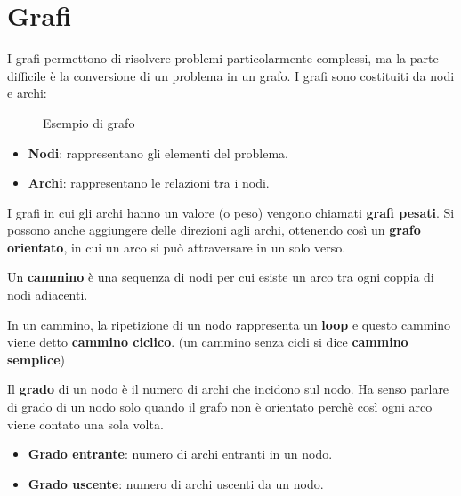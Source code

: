 \documentclass[a4paper]{article}
\begin{document}


\tableofcontents
\pagebreak

\section{Grafi}
I grafi permettono di risolvere problemi particolarmente complessi, ma la parte difficile
è la conversione di un problema in un grafo. I grafi sono costituiti da nodi e archi:
\begin{figure}[H]
  \centering
  \caption{Esempio di grafo}
  \label{fig:grafo1}
\end{figure}
\begin{itemize}
  \item \textbf{Nodi}: rappresentano gli elementi del problema.
  \item \textbf{Archi}: rappresentano le relazioni tra i nodi.
\end{itemize}
I grafi in cui gli archi hanno un valore (o peso) vengono chiamati \textbf{grafi pesati}.
Si possono anche aggiungere delle direzioni agli archi, ottenendo così un 
\textbf{grafo orientato}, in cui un arco si può attraversare in un solo verso.
\begin{definition}[Cammino]
  Un \textbf{cammino} è una sequenza di nodi per cui esiste un arco tra ogni coppia di nodi adiacenti.
\end{definition}
In un cammino, la ripetizione di un nodo rappresenta un \textbf{loop} e questo cammino
viene detto \textbf{cammino ciclico}. (un cammino senza cicli si dice \textbf{cammino
semplice})

Il \textbf{grado} di un nodo è il numero di archi che incidono sul nodo. Ha senso parlare
di grado di un nodo solo quando il grafo non è orientato perchè così ogni arco viene
contato una sola volta.
\begin{itemize}
  \item \textbf{Grado entrante}: numero di archi entranti in un nodo.
  \item \textbf{Grado uscente}: numero di archi uscenti da un nodo.
\end{itemize}
\end{document}

